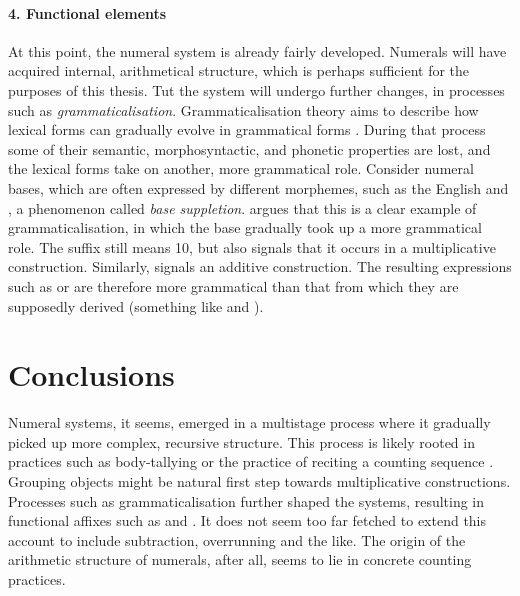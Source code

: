 \documentclass{../src/bcthesispart}
\begin{document}
\paragraph{4. Functional elements}
At this point, the numeral system is already fairly developed.
Numerals will have acquired internal, arithmetical structure, which is perhaps sufficient for the purposes of this thesis.
Tut the system will undergo further changes, in processes such as \emph{grammaticalisation}.
Grammaticalisation theory aims to describe how lexical forms can gradually evolve in grammatical forms \parencite{Heine2002}.
During that process some of their semantic, morphosyntactic, and phonetic properties are lost, and the lexical forms take on another, more grammatical role.
Consider numeral bases, which are often expressed by different morphemes, such as the English  and , a phenomenon called \emph{base suppletion}\parencite[56]{Hurford1987}.
\textcite{VonMengden2008} argues that this is a clear example of grammaticalisation, in which the base gradually took up a more grammatical role.  
The suffix  still means 10, but also signals that it occurs in a multiplicative construction.
Similarly,  signals an additive construction.
The resulting expressions such as  or  are therefore more grammatical than that from which they are supposedly derived (something like  and  ).






\section{Conclusions}


Numeral systems, it seems, emerged in a multistage process where it gradually picked up more complex, recursive structure.
This process is likely rooted in practices such as body-tallying \parencite{VonMengden2008} or the practice of reciting a counting sequence \parencite{Hurford2007}.
Grouping objects might be natural first step towards multiplicative constructions.
Processes such as grammaticalisation further shaped the systems, resulting in functional affixes such as  and .
It does not seem too far fetched to extend this account to include subtraction, overrunning and the like.
The origin of the arithmetic structure of numerals, after all, seems to lie in concrete counting practices.
\end{document}
